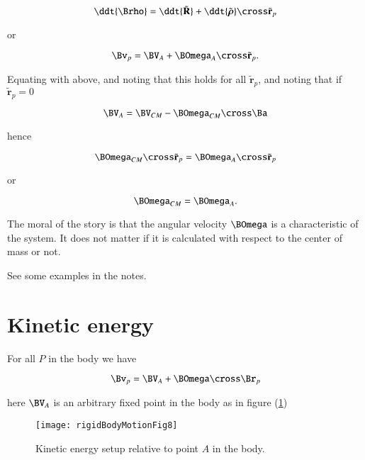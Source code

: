 \begin{equation}\label{eqn:rigidBodyMotion:260}
\ddt{\Brho} 
= \ddt{\tilde{\mathbf{R}}} + \ddt{\tilde{\boldsymbol{\rho}}} \cross \tilde{\mathbf{r}}_p 
\end{equation}

or

\begin{equation}\label{eqn:rigidBodyMotion:280}
\Bv_p = \BV_A + \BOmega_A \cross \tilde{\mathbf{r}}_p.
\end{equation}

Equating with above, and noting that this holds for all $\tilde{\mathbf{r}}_p$, and noting that if $\tilde{\mathbf{r}}_p = 0$

\begin{equation}\label{eqn:rigidBodyMotion:300}
\BV_A = \BV_{CM} - \BOmega_{CM} \cross \Ba
\end{equation}

hence

\begin{equation}\label{eqn:rigidBodyMotion:320}
\BOmega_{CM} \cross \tilde{\mathbf{r}}_p = \BOmega_A \cross \tilde{\mathbf{r}}_p
\end{equation}

or

\begin{equation}\label{eqn:rigidBodyMotion:340}
\BOmega_{CM} = \BOmega_A.
\end{equation}

The moral of the story is that the angular velocity $\BOmega$ is a characteristic of the system.  It does not matter if it is calculated with respect to the center of mass or not.

See some examples in the notes.

\section{Kinetic energy}

For all $P$ in the body we have

\begin{equation}\label{eqn:rigidBodyMotion:360}
\Bv_p = \BV_A + \BOmega \cross \Br_p
\end{equation}

here $\BV_A$ is an arbitrary fixed point in the body as in figure (\ref{fig:rigidBodyMotion:rigidBodyMotionFig8})

\begin{figure}[htp]
   \centering
   \texttt{[image: rigidBodyMotionFig8]}
   \caption{Kinetic energy setup relative to point $A$ in the body.}\label{fig:rigidBodyMotion:rigidBodyMotionFig8}
\end{figure}

